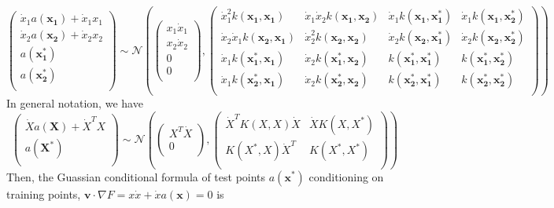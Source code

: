 \documentclass{article}
\begin{document}
 $$
 \begin{pmatrix}
   \dot{x}_1a(\mathbf{x_1}) + \dot{x}_1x_1\\
   \dot{x}_2a(\mathbf{x_2}) + \dot{x}_2x_2 \\
   a(\mathbf{x^*_1}) \\
   a(\mathbf{x^*_2}) \\
 \end{pmatrix}
 \sim \mathcal{N}
 \left(\begin{pmatrix}
  x_1\dot{x}_1\\
  x_2\dot{x}_2\\
  0\\
  0\\
\end{pmatrix}, 
\begin{pmatrix}
  \dot{x}_1^2k(\mathbf{x_1}, \mathbf{x_1}) &  \dot{x}_1\dot{x}_2k(\mathbf{x_1}, \mathbf{x_2}) &  \dot{x}_1k(\mathbf{x_1}, \mathbf{x^*_1})&  \dot{x}_1k(\mathbf{x_1}, \mathbf{x^*_2}) \\
  \dot{x}_2\dot{x}_1k(\mathbf{x_2}, \mathbf{x_1}) &  \dot{x}_2^2k(\mathbf{x_2}, \mathbf{x_2}) &  \dot{x}_2k(\mathbf{x_2}, \mathbf{x^*_1})&  \dot{x}_2k(\mathbf{x_2}, \mathbf{x^*_2}) \\
  \dot{x}_1k(\mathbf{x_1^*}, \mathbf{x_1}) & \dot{x}_2k(\mathbf{x_1^*}, \mathbf{x_2})& k(\mathbf{x_1^*}, \mathbf{x_1^*})&k(\mathbf{x_1^*}, \mathbf{x_2^*})\\
  \dot{x}_1k(\mathbf{x_2^*}, \mathbf{x_1}) & \dot{x}_2k(\mathbf{x_2^*}, \mathbf{x_2})& k(\mathbf{x_2^*}, \mathbf{x_1^*})&k(\mathbf{x_2^*}, \mathbf{x_2^*})\\
\end{pmatrix}\right) 
$$
In general notation, we have 
$$
\begin{pmatrix}
  \dot{X}a(\mathbf{X}) + \dot{X}^TX\\
  a(\mathbf{X^*}) \\
\end{pmatrix}
\sim \mathcal{N}
\left(\begin{pmatrix}
  X^T\dot{X}\\
  0\\
\end{pmatrix}, 
\begin{pmatrix}
  \dot{X}^TK(X,X)\dot{X} & \dot{X}K(X, X^*)\\
  K(X^*, X)\dot{X}^T & K(X^*, X^*)\\
\end{pmatrix}\right) 
$$
Then, the Guassian conditional formula of test points $a(\mathbf{x^*})$  conditioning on training points, $\mathbf{v}\cdot\nabla F = x\dot{x}+\dot{x}a(\mathbf{x})=0$ is 
\end{document}
